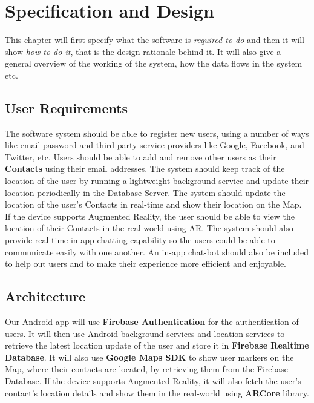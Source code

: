 \chapter{Specification and Design} 
\label{chap2}

This chapter will first specify what the software is \textit{required to do} and then it will show \textit{how to do it}, that is the design rationale behind it. It will also give a general overview of the working of the system, how the data flows in the system etc.

\section{User Requirements}
The software system should be able to register new users, using a number of ways like email-password and third-party service providers like Google, Facebook, and Twitter, etc. Users should be able to add and remove other users as their \textbf{Contacts} using their email addresses. The system should keep track of the location of the user by running a lightweight background service and update their location periodically in the Database Server. The system should update the location of the user's Contacts in real-time and show their location on the Map. If the device supports Augmented Reality, the user should be able to view the location of their Contacts in the real-world using AR. The system should also provide real-time in-app chatting capability so the users could be able to communicate easily with one another. An in-app chat-bot should also be included to help out users and to make their experience more efficient and enjoyable.

%

\section{Architecture}
Our Android app will use \textbf{Firebase Authentication} for the authentication of users. It will then use Android background services and location services to retrieve the latest location update of the user and store it in \textbf{Firebase Realtime Database}. It will also use \textbf{Google Maps SDK} to show user markers on the Map, where their contacts are located, by retrieving them from the Firebase Database. If the device supports Augmented Reality, it will also fetch the user's contact's location details and show them in the real-world using \textbf{ARCore} library.

